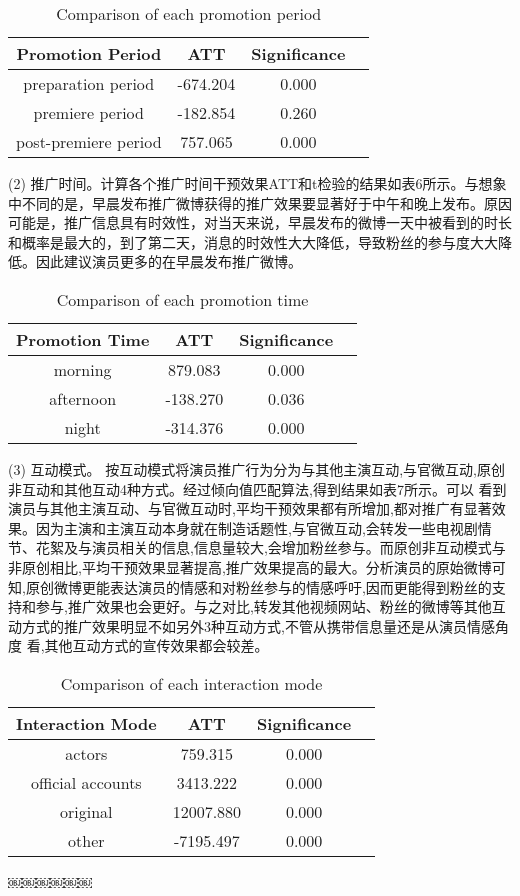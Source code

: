 \begin{table}[H]
\centering
\caption{Comparison of each promotion period}
\begin{tabular}{|c|c|c|c|} \hline
Promotion Period& ATT & Significance\\ \hline
preparation period & -674.204& 0.000\\ \hline
premiere period & -182.854& 0.260\\ \hline
post-premiere period & 757.065 & 0.000\\ 
\hline\end{tabular}

\end{table}

(2) 推广时间。计算各个推广时间干预效果ATT和t检验的结果如表6所示。与想象中不同的是，早晨发布推广微博获得的推广效果要显著好于中午和晚上发布。原因可能是，推广信息具有时效性，对当天来说，早晨发布的微博一天中被看到的时长和概率是最大的，到了第二天，消息的时效性大大降低，导致粉丝的参与度大大降低。因此建议演员更多的在早晨发布推广微博。

\begin{table}[H]
\centering
\caption{Comparison of each promotion time}
\begin{tabular}{|c|c|c|c|} \hline
Promotion Time& ATT & Significance\\ \hline
morning & 879.083& 0.000\\ \hline
afternoon & -138.270& 0.036\\ \hline
night & -314.376 & 0.000\\ 
\hline\end{tabular}

\end{table}

(3) 互动模式。
按互动模式将演员推广行为分为与其他主演互动,与官微互动,原创非互动和其他互动4种方式。经过倾向值匹配算法,得到结果如表7所示。可以 看到演员与其他主演互动、与官微互动时,平均干预效果都有所增加,都对推广有显著效果。因为主演和主演互动本身就在制造话题性,与官微互动,会转发一些电视剧情节、花絮及与演员相关的信息,信息量较大,会增加粉丝参与。而原创非互动模式与非原创相比,平均干预效果显著提高,推广效果提高的最大。分析演员的原始微博可知,原创微博更能表达演员的情感和对粉丝参与的情感呼吁,因而更能得到粉丝的支持和参与,推广效果也会更好。与之对比,转发其他视频网站、粉丝的微博等其他互动方式的推广效果明显不如另外3种互动方式,不管从携带信息量还是从演员情感角度 看,其他互动方式的宣传效果都会较差。


\begin{table}[H]
\centering
\caption{Comparison of each interaction mode}
\begin{tabular}{|c|c|c|c|} \hline
Interaction Mode& ATT & Significance\\ \hline
actors & 759.315& 0.000\\ \hline
official accounts & 3413.222& 0.000\\ \hline
original & 12007.880& 0.000\\ \hline
other & -7195.497 & 0.000\\ 
\hline\end{tabular}

\end{table}￼￼￼￼￼￼

